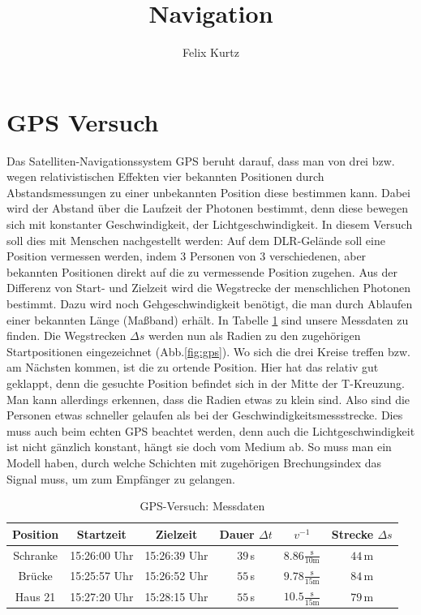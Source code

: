 \documentclass[12pt,a4paper,headinclude,bibtotoc]{scrartcl}
\begin{document}
\title{Navigation}
\author{Felix Kurtz}
\maketitle

\section{GPS Versuch}
Das Satelliten-Navigationssystem \textsc{GPS} beruht darauf, dass man von drei bzw. wegen relativistischen Effekten vier bekannten Positionen durch Abstandsmessungen zu einer unbekannten Position diese bestimmen kann.
Dabei wird der Abstand über die Laufzeit der Photonen bestimmt, denn diese bewegen sich mit konstanter Geschwindigkeit, der Lichtgeschwindigkeit.
In diesem Versuch soll dies mit Menschen nachgestellt werden:
Auf dem DLR-Gelände soll eine Position vermessen werden, indem 3 Personen von 3 verschiedenen, aber bekannten Positionen direkt auf die zu vermessende Position zugehen.
Aus der Differenz von Start- und Zielzeit wird die Wegstrecke der menschlichen Photonen bestimmt.
Dazu wird noch Gehgeschwindigkeit benötigt, die man durch Ablaufen einer bekannten Länge (Maßband) erhält.
In Tabelle \ref{tab:gps} sind unsere Messdaten zu finden.
Die Wegstrecken $\Delta s$ werden nun als Radien zu den zugehörigen Startpositionen eingezeichnet (Abb.\ref{fig:gps}).
Wo sich die drei Kreise treffen bzw. am Nächsten kommen, ist die zu ortende Position.
Hier hat das relativ gut geklappt, denn die gesuchte Position befindet sich in der Mitte der T-Kreuzung.
Man kann allerdings erkennen, dass die Radien etwas zu klein sind.
Also sind die Personen etwas schneller gelaufen als bei der Geschwindigkeitsmessstrecke.
Dies muss auch beim echten GPS beachtet werden, denn auch die Lichtgeschwindigkeit ist nicht gänzlich konstant, hängt sie doch vom Medium ab.
So muss man ein Modell haben, durch welche Schichten mit zugehörigen Brechungsindex das Signal muss, um zum Empfänger zu gelangen.

\begin{table}[!htb]
	\centering
	\begin{tabular}{|c|c|c|c|c|c|}
		\hline		
		Position & Startzeit & Zielzeit & Dauer $\Delta t$ & $v^{-1}$ & Strecke $\Delta s$\\
		\hline
		Schranke & 15:26:00 Uhr & 15:26:39 Uhr & $39\,$s & $8.86 \frac{\si{\second}}{10\si{\meter}}$ & $44\,$m\\
		Brücke & 15:25:57 Uhr & 15:26:52 Uhr & $55\,$s & $9.78 \frac{\si{\second}}{15\si{\meter}}$ & $84\,$m\\
		Haus 21 & 15:27:20 Uhr & 15:28:15 Uhr & $55\,$s & $10.5 \frac{\si{\second}}{15\si{\meter}}$ & $79\,$m\\
		\hline
	\end{tabular}
	\caption{GPS-Versuch: Messdaten}
	\label{tab:gps}
\end{table}
\end{document}
